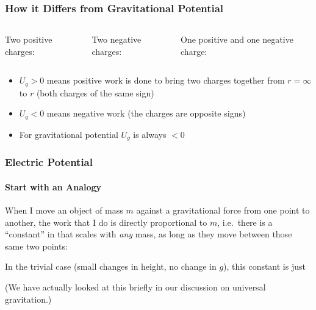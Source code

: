 \documentclass[12pt,aspectratio=169]{beamer}
\newcommand{\eq}[2]{\vspace{#1}{\Large\begin{displaymath}#2\end{displaymath}}}
\begin{document}
\begin{frame}
  \frametitle{How it Differs from Gravitational Potential}
  \begin{columns}
    \begin{center}
      Two positive charges:

      \eq{-0.3in}{U_q>0}
    \end{center}
    \begin{center}
      Two negative charges:

      \eq{-0.3in}{U_q>0}
    \end{center}
    \begin{center}
      One positive and one negative charge:

      \eq{-0.5in}{U_q<0}
    \end{center}
  \end{columns}

  \vspace{.2in}
  \begin{itemize}
  \item $U_q>0$ means positive work is done to bring two charges together from
   $r=\infty$ to $r$ (both charges of the same sign)
  \item $U_q<0$ means negative work (the charges are opposite signs)
  \item For gravitational potential $U_g$ is always $<0$
  \end{itemize}
\end{frame}

\begin{frame}
  \frametitle{Electric Potential}
  \framesubtitle{Start with an Analogy}

  When I move an object of mass $m$ against a gravitational force from one
  point to another, the work that I do is directly proportional to $m$, i.e.\
  there is a ``constant'' in that scales with \emph{any} mass, as long as they
  move between those same two points:

  \eq{-.25in}{W=Km}

  \vspace{-.15in}In the trivial case (small changes in height, no change in
  $g$), this constant is just

  \eq{-.15in}{
    \frac{W}{m}=g\Delta h
  }

  \vspace{-.1in}(We have actually looked at this briefly in our discussion on
  universal gravitation.)
\end{frame}
\end{document}
